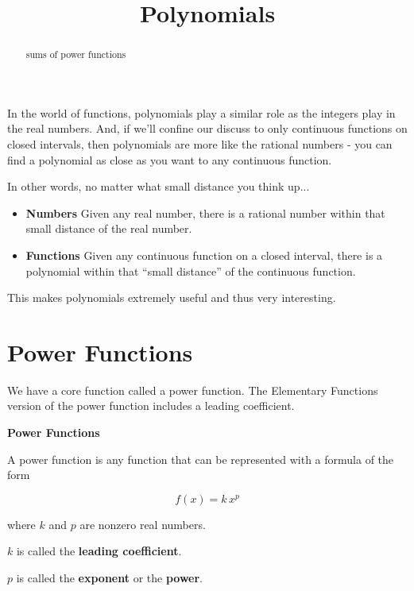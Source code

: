 \documentclass{ximera}
\title{Polynomials}
\begin{document}
\begin{abstract}
sums of power functions
\end{abstract}
\maketitle


In the world of functions, polynomials play a similar role as the integers play in the real numbers. And, if we'll confine our discuss to only continuous functions on closed intervals, then polynomials are more like the rational numbers - you can find a polynomial as close as you want to any continuous function. 


In other words, no matter what small distance you think up...

\begin{itemize}
\item \textbf{Numbers} Given any real number, there is a rational number within that small distance of the real number.

\item \textbf{Functions} Given any continuous function on a closed interval, there is a polynomial within that ``small distance'' of the continuous function.
\end{itemize}

This makes polynomials extremely useful and thus very interesting. 














\section*{Power Functions}

We have a core function called a power function. The Elementary Functions version of the power function includes a leading coefficient.

\begin{definition} \textbf{\textcolor{green!50!black}{Power Functions}}

A power function is any function that can be represented with a formula of the form

\[   f(x) = k \, x^p      \]

where $k$ and $p$ are nonzero real numbers.

$k$ is called the \textbf{leading coefficient}.

$p$ is called the \textbf{exponent} or the \textbf{power}.


\end{definition}
\end{document}
